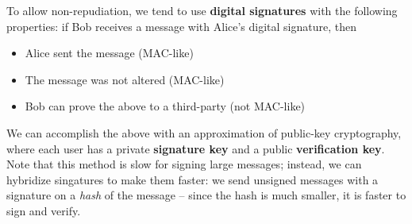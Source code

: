 \documentclass[12pt]{article}
\begin{document}
To allow non-repudiation, we tend to use {\bf digital signatures} with the following properties: if Bob receives a message with Alice's digital signature, then
\begin{itemize}
\item Alice sent the message (MAC-like)
\item The message was not altered (MAC-like)
\item Bob can prove the above to a third-party (not MAC-like)
\end{itemize}

We can accomplish the above with an approximation of public-key cryptography, where each user has a private {\bf signature key} and a public {\bf verification key}. Note that this method is slow for signing large messages; instead, we can hybridize singatures to make them faster: we send unsigned messages with a signature on a \emph{hash} of the message -- since the hash is much smaller, it is faster to sign and verify.
\end{document}
